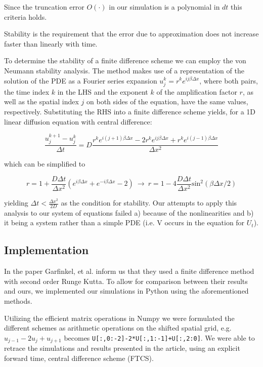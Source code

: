 \documentclass{article}
\begin{document}
 Since the truncation error $O(\cdot)$ in our simulation is a polynomial in $dt$ this criteria holds.

 
 Stability is the requirement that the error due to approximation does not increase faster than linearly with time. 

To determine the stability of a finite difference scheme we can employ the von Neumann stability analysis. The method makes use of a representation of the solution of the PDE as a Fourier series expansion $u_j^k=r^ke^{ij\beta \Delta x}$, where both pairs, the time index $k$ in the LHS and the exponent $k$ of the amplification factor $r$, as well as the spatial index $j$ on both sides of the equation, have the same values, respectively. Substituting the RHS into a finite difference scheme yields, for a 1D linear diffusion equation with central difference:

$$\frac{u_j^{k+1}-u_j^k}{\Delta t} = D\frac{r^ke^{i(j+1)\beta \Delta x}-2r^ke^{ij\beta \Delta x}+r^ke^{i(j-1)\beta \Delta x}}{\Delta x^2}$$

\medskip
which can be simplified to
\smallskip

$$r=1+\frac{D \Delta t}{\Delta x^2}(e^{i\beta \Delta x}+e^{-i\beta \Delta x}-2)\ \to\ r=1-4\frac{D \Delta t}{\Delta x^2} \mathrm{sin}^2(\beta\Delta x/2)$$
\smallskip

yielding $\Delta t < \frac{\Delta x^2}{2D}$ as the condition for stability. Our attempts to apply this analysis to our system of equations failed a) because of the nonlinearities and b) it being a system rather than a simple PDE (i.e. V occurs in the equation for $U_t$).

\subsection{Implementation}

In the paper Garfinkel, et al. inform us that they used a finite difference method with second order Runge Kutta. To allow for comparison between their results and ours, we implemented our simulations in Python using the aforementioned methods.

Utilizing the efficient matrix operations in Numpy we were formulated the different schemes as arithmetic operations on the shifted spatial grid, e.g. $u_{j-1}-2u_j+u_{j+1}$ becomes \texttt{U[:,0:-2]-2*U[:,1:-1]+U[:,2:0]}. We were able to retrace the simulations and results presented in the article, using an explicit forward time, central difference scheme (FTCS).
\end{document}
